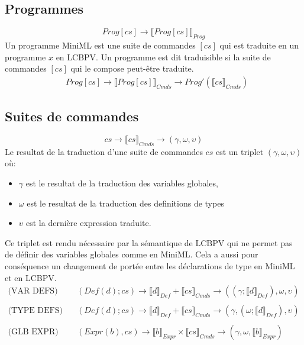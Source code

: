 \documentclass[
  12pt,
]{article}
\providecommand{\tightlist}{%
  \setlength{\itemsep}{0pt}\setlength{\parskip}{0pt}}
\begin{document}
\hypertarget{programmes-1}{%
  \subsection{Programmes}\label{programmes-1}}

\[ Prog[cs] \rightarrow \llbracket Prog[cs] \rrbracket_{Prog}  \] Un programme MiniML
est une suite de commandes \([cs]\) qui est traduite en un programme
\(x\) en LCBPV. Un programme est dit traduisible si la suite de
commandes \([cs]\) qui le compose peut-être traduite.
\begin{align*}
   & Prog[cs] \rightarrow  \llbracket Prog[cs] \rrbracket_{Cmds} \rightarrow Prog'(\llbracket cs \rrbracket_{Cmds} )
\end{align*}

\hypertarget{suites-de-commandes}{%
  \subsection{Suites de commandes}\label{suites-de-commandes}}

\[ cs \rightarrow \llbracket cs \rrbracket_{Cmds} \rightarrow (\gamma,\omega,\upsilon) \] Le
resultat de la traduction d'une suite de commandes \(cs\) est un triplet
\((\gamma,\omega,\upsilon)\) où:

\begin{itemize}
  \tightlist
  \item
        \(\gamma\) est le resultat de la traduction des variables globales,
  \item
        \(\omega\) est le resultat de la traduction des definitions de types
  \item
        \(\upsilon\) est la dernière expression traduite.
\end{itemize}

Ce triplet est rendu nécessaire par la sémantique de LCBPV qui ne permet
pas de définir des variables globales comme en MiniML. Cela a aussi pour
conséquence un changement de portée entre les déclarations de type en
MiniML et en LCBPV.
\begin{align*}
  \text{(VAR DEFS)} \quad  & (Def(d); cs) \rightarrow \llbracket d \rrbracket_{Def} +  \llbracket cs \rrbracket_{Cmds} \rightarrow ((\gamma;\llbracket d \rrbracket_{Def}),\omega,\upsilon) \\
  \\
  \text{(TYPE DEFS)} \quad & (Def(d); cs) \rightarrow \llbracket d \rrbracket_{Def} + \llbracket cs \rrbracket_{Cmds} \rightarrow (\gamma,(\omega;\llbracket d \rrbracket_{Def}),\upsilon)  \\
  \\
  \text{(GLB EXPR)} \quad  & (Expr(b), cs) \rightarrow \llbracket b \rrbracket_{Expr} \times \llbracket cs \rrbracket_{Cmds}  \rightarrow (\gamma,\omega,\llbracket b \rrbracket_{Expr})
\end{align*}
\end{document}
